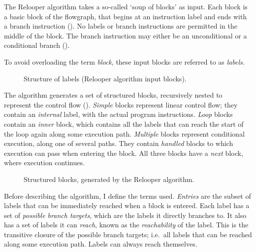 \documentclass[00-main.tex]{subfiles}
\begin{document}

The Relooper algorithm takes a so-called `soup of blocks' as input.
Each block is a basic block of the flowgraph, that begins at an instruction label and ends with a branch instruction ().
No labels or branch instructions are permitted in the middle of the block.
The branch instruction may either be an unconditional or a conditional branch ().

To avoid overloading the term \emph{block}, these input blocks are referred to as \emph{labels}.

\begin{figure}[b]
  \centering
  \caption{Structure of labels (Relooper algorithm input blocks).\vspace{-\baselineskip}}
  \label{fig:relooper input label structure} %
\end{figure}

The algorithm generates a set of structured blocks, recursively nested to represent the control flow ().
\emph{Simple} blocks represent linear control flow; they contain an \emph{internal} label, with the actual program instructions.
\emph{Loop} blocks contain an \emph{inner} block, which contains all the labels that can reach the start of the loop again along some execution path.
\emph{Multiple} blocks represent conditional execution, along one of several paths.
They contain \emph{handled} blocks to which execution can pass when entering the block.
All three blocks have a \emph{next} block, where execution continues.

\begin{figure}[t]
  \centering
  \caption{Structured blocks, generated by the Relooper algorithm.}
  \label{fig:relooper output blocks structure} %
\end{figure}


Before describing the algorithm, I define the terms used.
\emph{Entries} are the subset of labels that can be immediately reached when a block is entered.
Each label has a set of \emph{possible branch targets}, which are the labels it directly branches to.
It also has a set of labels it can \emph{reach}, known as the \emph{reachability} of the label.
This is the transitive closure of the possible branch targets; i.e.\ all labels that can be reached along some execution path.
Labels can always reach themselves.
\end{document}
